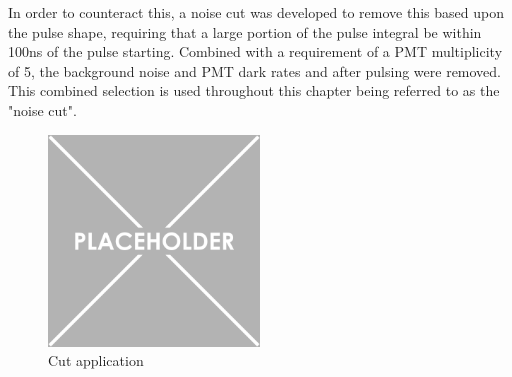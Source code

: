 \par
In order to counteract this, a noise cut was developed to remove this based upon the pulse shape, requiring that a large portion of the pulse integral be within 100ns of the pulse starting.
Combined with a requirement of a PMT multiplicity of 5, the background noise and PMT dark rates and after pulsing were removed.
This combined selection is used throughout this chapter being referred to as the "noise cut".

\begin{figure}
    \centering
    \includegraphics[width=0.5\textwidth]{Figures/Placeholder.png}
    \caption{Cut application}
    \label{fig:od_noise_cut}
\end{figure}